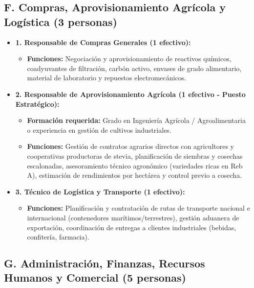 \subsection{F. Compras, Aprovisionamiento Agrícola y Logística (3 personas)}

\begin{itemize}[leftmargin=*]
    \item \textbf{1. Responsable de Compras Generales (1 efectivo):}
          \begin{itemize}
              \item \textbf{Funciones:} Negociación y aprovisionamiento de reactivos químicos, coadyuvantes de filtración, carbón activo, envases de grado alimentario, material de laboratorio y repuestos electromecánicos.
          \end{itemize}

    \item \textbf{2. Responsable de Aprovisionamiento Agrícola (1 efectivo - Puesto Estratégico):}
          \begin{itemize}
              \item \textbf{Formación requerida:} Grado en Ingeniería Agrícola / Agroalimentaria o experiencia en gestión de cultivos industriales.
              \item \textbf{Funciones:} Gestión de contratos agrarios directos con agricultores y cooperativas productoras de stevia, planificación de siembras y cosechas escalonadas, asesoramiento técnico agronómico (variedades ricas en Reb A), estimación de rendimientos por hectárea y control previo a cosecha.
          \end{itemize}

    \item \textbf{3. Técnico de Logística y Transporte (1 efectivo):}
          \begin{itemize}
              \item \textbf{Funciones:} Planificación y contratación de rutas de transporte nacional e internacional (contenedores marítimos/terrestres), gestión aduanera de exportación, coordinación de entregas a clientes industriales (bebidas, confitería, farmacia).
          \end{itemize}
\end{itemize}

\subsection{G. Administración, Finanzas, Recursos Humanos y Comercial (5 personas)}

